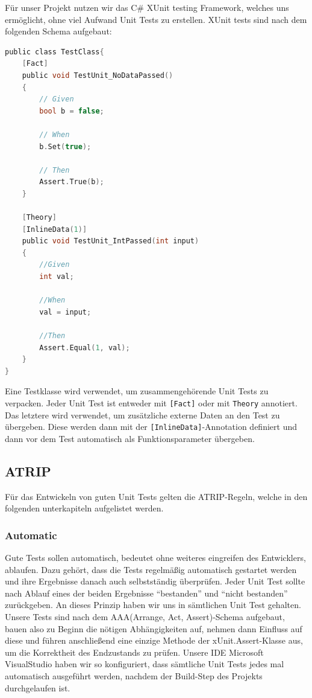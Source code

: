 \documentclass[
10pt, %
a4paper, %
oneside, %
headinclude,footinclude, %
BCOR5mm, %
]{scrartcl}
\begin{document}
\begin{onehalfspace}
Für unser Projekt nutzen wir das C\# XUnit testing Framework, welches uns ermöglicht, ohne viel Aufwand Unit Tests zu erstellen.
XUnit tests sind nach dem folgenden Schema aufgebaut:
\begin{lstlisting}[language=c, style=mStyle]
public class TestClass{
	[Fact]
	public void TestUnit_NoDataPassed()
	{
		// Given
		bool b = false;

		// When
		b.Set(true);

		// Then
		Assert.True(b);
	}

	[Theory]
	[InlineData(1)]
	public void TestUnit_IntPassed(int input)
	{
		//Given
		int val;

		//When
		val = input;

		//Then
		Assert.Equal(1, val);
	}
}
\end{lstlisting}

Eine Testklasse wird verwendet, um zusammengehörende Unit Tests zu verpacken. Jeder Unit Test ist entweder mit \texttt{[Fact]} oder mit \texttt{Theory} annotiert. Das letztere wird verwendet, um zusätzliche externe Daten an den Test zu übergeben. Diese werden dann mit der \texttt{[InlineData]}-Annotation definiert und dann vor dem Test automatisch als Funktionsparameter übergeben.
\subsection{ATRIP}
Für das Entwickeln von guten Unit Tests gelten die ATRIP-Regeln, welche in den folgenden unterkapiteln aufgelistet werden.
\subsubsection{Automatic}
Gute Tests sollen automatisch, bedeutet ohne weiteres eingreifen des Entwicklers, ablaufen. Dazu gehört, dass die Tests regelmäßig automatisch gestartet werden und ihre Ergebnisse danach auch selbstständig überprüfen. Jeder Unit Test sollte nach Ablauf eines der beiden Ergebnisse \enquote{bestanden} und \enquote{nicht bestanden} zurückgeben.
An dieses Prinzip haben wir uns in sämtlichen Unit Test gehalten. Unsere Tests sind nach dem AAA(Arrange, Act, Assert)-Schema aufgebaut, bauen also zu Beginn die nötigen Abhängigkeiten auf, nehmen dann Einfluss auf diese und führen anschließend eine einzige Methode der xUnit.Assert-Klasse aus, um die Korrektheit des Endzustands zu prüfen. Unsere IDE Microsoft VisualStudio haben wir so konfiguriert, dass sämtliche Unit Tests jedes mal automatisch ausgeführt werden, nachdem der Build-Step des Projekts durchgelaufen ist.


\end{onehalfspace}
\end{document}
